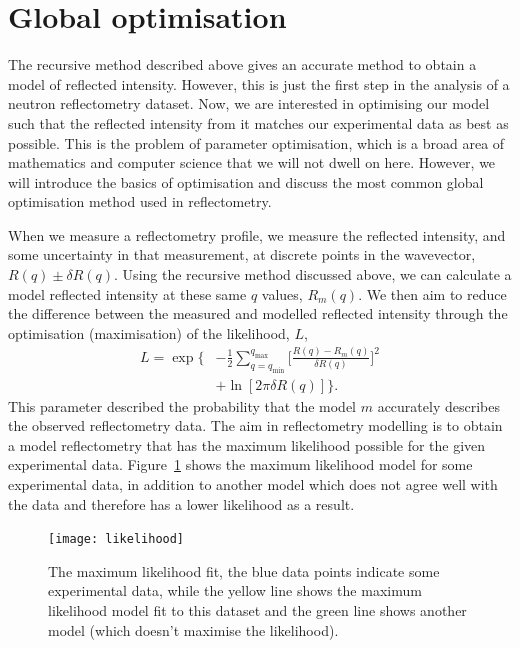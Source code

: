 \documentclass[
 reprint,
 superscriptaddress,
 amsmath,amssymb,
 aps,
]{revtex4-1}
\begin{document}
\section{Global optimisation}

The recursive method described above gives an accurate method to obtain a model of reflected intensity.
However, this is just the first step in the analysis of a neutron reflectometry dataset.
Now, we are interested in optimising our model such that the reflected intensity from it matches our experimental data as best as possible.
This is the problem of parameter optimisation, which is a broad area of mathematics and computer science that we will not dwell on here. 
However, we will introduce the basics of optimisation and discuss the most common global optimisation method used in reflectometry.

When we measure a reflectometry profile, we measure the reflected intensity, and some uncertainty in that measurement, at discrete points in the wavevector, $R(q) \pm \delta R(q)$.
Using the recursive method discussed above, we can calculate a model reflected intensity at these same $q$ values, $R_m(q)$.
We then aim to reduce the difference between the measured and modelled reflected intensity through the optimisation (maximisation) of the likelihood, $L$, %
%
\begin{equation}
    \begin{aligned}
        L = \exp\bigg\{ & - \frac{1}{2} \sum_{q=q_{\text{min}}}^{q_{\text{max}}} \bigg[\frac{R(q) - R_m(q)}{\delta R(q)}\bigg]^2 \\
         & + \ln[2\pi \delta R(q)]\bigg\}.
    \end{aligned}
\end{equation}
%
This parameter described the probability that the model $m$ accurately describes the observed reflectometry data.
The aim in reflectometry modelling is to obtain a model reflectometry that has the maximum likelihood possible for the given experimental data.
Figure~\ref{fig:likelihood} shows the maximum likelihood model for some experimental data, in addition to another model which does not agree well with the data and therefore has a lower likelihood as a result.
%
\begin{figure}[t]
    \texttt{[image: likelihood]}
    \caption{The maximum likelihood fit, the blue data points indicate some experimental data, while the yellow line shows the maximum likelihood model fit to this dataset and the green line shows another model (which doesn't maximise the likelihood).}
    \label{fig:likelihood}
\end{figure}
%
\end{document}
